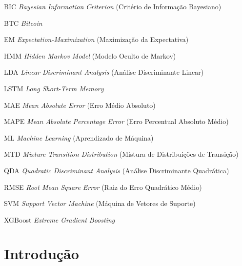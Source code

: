 \documentclass[
    12pt,                %
    openright,           %
    oneside,             %
    a4paper,             %
    english,             %
    brazil               %
]{abntex2}
\begin{document}
\begin{siglas}
  \item[BIC] \emph{Bayesian Information Criterion} (Critério de Informação Bayesiano)
  \item[BTC] \emph{Bitcoin}
  \item[EM] \emph{Expectation-Maximization} (Maximização da Expectativa)
  \item[HMM] \emph{Hidden Markov Model} (Modelo Oculto de Markov)
  \item[LDA] \emph{Linear Discriminant Analysis} (Análise Discriminante Linear)
  \item[LSTM] \emph{Long Short-Term Memory}
  \item[MAE] \emph{Mean Absolute Error} (Erro Médio Absoluto)
  \item[MAPE] \emph{Mean Absolute Percentage Error} (Erro Percentual Absoluto Médio)
  \item[ML] \emph{Machine Learning} (Aprendizado de Máquina)
  \item[MTD] \emph{Mixture Transition Distribution} (Mistura de Distribuições de Transição)
  \item[QDA] \emph{Quadratic Discriminant Analysis} (Análise Discriminante Quadrática)
  \item[RMSE] \emph{Root Mean Square Error} (Raiz do Erro Quadrático Médio)
  \item[SVM] \emph{Support Vector Machine} (Máquina de Vetores de Suporte)
  \item[XGBoost] \emph{Extreme Gradient Boosting}
\end{siglas}
\cleardoublepage
 
\tableofcontents*
\cleardoublepage

\textual

\chapter{Introdução}
\label{cap:introducao}
\end{document}
